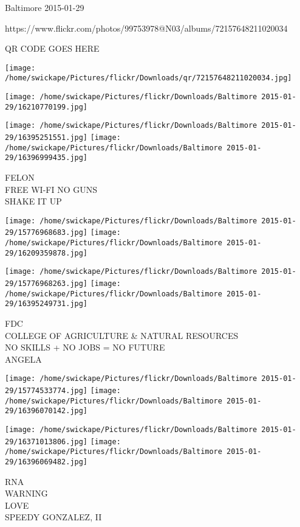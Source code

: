 \documentclass[10pt,letterpaper]{article}
\begin{document}
Baltimore 2015-01-29

https://www.flickr.com/photos/99753978@N03/albums/72157648211020034

QR CODE GOES HERE

\texttt{[image: /home/swickape/Pictures/flickr/Downloads/qr/72157648211020034.jpg]}
\pagebreak

\texttt{[image: /home/swickape/Pictures/flickr/Downloads/Baltimore 2015-01-29/16210770199.jpg]}

\vspace{0.25in}
\texttt{[image: /home/swickape/Pictures/flickr/Downloads/Baltimore 2015-01-29/16395251551.jpg]}
\texttt{[image: /home/swickape/Pictures/flickr/Downloads/Baltimore 2015-01-29/16396999435.jpg]}

FELON\\
FREE WI{-}FI NO GUNS\\
SHAKE IT UP\\
\pagebreak

\texttt{[image: /home/swickape/Pictures/flickr/Downloads/Baltimore 2015-01-29/15776968683.jpg]}
\texttt{[image: /home/swickape/Pictures/flickr/Downloads/Baltimore 2015-01-29/16209359878.jpg]}

\texttt{[image: /home/swickape/Pictures/flickr/Downloads/Baltimore 2015-01-29/15776968263.jpg]}
\texttt{[image: /home/swickape/Pictures/flickr/Downloads/Baltimore 2015-01-29/16395249731.jpg]}

FDC\\
COLLEGE OF AGRICULTURE \& NATURAL RESOURCES\\
NO SKILLS + NO JOBS = NO FUTURE\\
ANGELA\\
\pagebreak

\texttt{[image: /home/swickape/Pictures/flickr/Downloads/Baltimore 2015-01-29/15774533774.jpg]}
\texttt{[image: /home/swickape/Pictures/flickr/Downloads/Baltimore 2015-01-29/16396070142.jpg]}

\texttt{[image: /home/swickape/Pictures/flickr/Downloads/Baltimore 2015-01-29/16371013806.jpg]}
\texttt{[image: /home/swickape/Pictures/flickr/Downloads/Baltimore 2015-01-29/16396069482.jpg]}

RNA\\
WARNING\\
LOVE\\
SPEEDY GONZALEZ, II\\
\pagebreak
\end{document}
